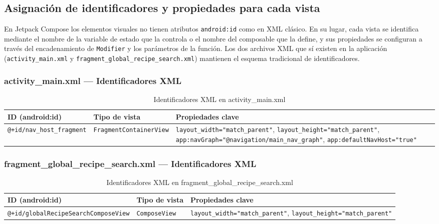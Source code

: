 \documentclass[stu, 12pt, letterpaper, donotrepeattitle, floatsintext, natbib]{apa7}
\begin{document}
\subsection{Asignación de identificadores y propiedades para cada vista}
\label{sec:identificadores}

En Jetpack Compose los elementos visuales no tienen atributos \texttt{android:id} como en
XML clásico. En su lugar, cada vista se identifica mediante el nombre de la variable de
estado que la controla o el nombre del composable que la define, y sus propiedades se
configuran a través del encadenamiento de \texttt{Modifier} y los parámetros de la
función. Los dos archivos XML que sí existen en la aplicación
(\texttt{activity\_main.xml} y \texttt{fragment\_global\_recipe\_search.xml}) mantienen el
esquema tradicional de identificadores.

\subsubsection{activity\_main.xml --- Identificadores XML}

\begin{table}[H]
\caption{Identificadores XML en activity\_main.xml}
\label{tab:idactivitymain}
\begin{tabularx}{\textwidth}{@{}p{3.5cm}p{3cm}X@{}}
\toprule
\textbf{ID (android:id)} & \textbf{Tipo de vista} & \textbf{Propiedades clave} \\
\midrule
\texttt{@+id/nav\_host\_fragment} & \texttt{FragmentContainerView} &
\texttt{layout\_width="match\_parent"}, \texttt{layout\_height="match\_parent"},
\texttt{app:navGraph="@navigation/main\_nav\_graph"},
\texttt{app:defaultNavHost="true"} \\
\bottomrule
\end{tabularx}
\end{table}

\subsubsection{fragment\_global\_recipe\_search.xml --- Identificadores XML}

\begin{table}[H]
\caption{Identificadores XML en fragment\_global\_recipe\_search.xml}
\label{tab:idfragmentsearch}
\begin{tabularx}{\textwidth}{@{}p{6cm}p{2.5cm}X@{}}
\toprule
\textbf{ID (android:id)} & \textbf{Tipo de vista} & \textbf{Propiedades clave} \\
\midrule
\texttt{@+id/globalRecipeSearchComposeView} & \texttt{ComposeView} &
\texttt{layout\_width="match\_parent"}, \texttt{layout\_height="match\_parent"} \\
\bottomrule
\end{tabularx}
\end{table}
\end{document}
